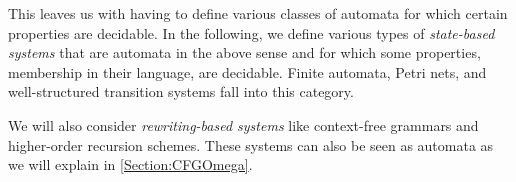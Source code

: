 \documentclass[../../diss.tex]{subfiles}
\begin{document}
This leaves us with having to define various classes of automata for which certain properties are decidable.
In the following, we define various types of \emph{state-based systems} that are automata in the above sense and for which some properties, \eg membership in their language, are decidable.
Finite automata, Petri nets, and well-structured transition systems fall into this category.

We will also consider \emph{rewriting-based systems} like context-free grammars and higher-order recursion schemes.
These systems can also be seen as automata as we will explain in \cref{Section:CFGOmega}.
\end{document}
